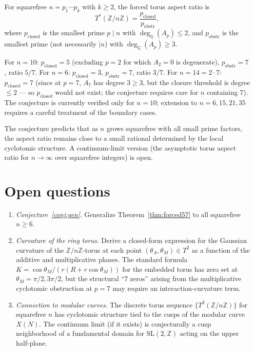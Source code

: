 \documentclass[11pt,reqno]{amsart}
\theoremstyle{plain}
\theoremstyle{definition}
\newcommand{\Z}{\mathbb{Z}}
\newcommand{\Q}{\mathbb{Q}}
\newcommand{\Zn}{\Z/n\Z}
\newcommand{\Tstar}{T^{*}}
\begin{document}
\begin{conjecture} \label{conj:gen}
For squarefree $n = p_1 \cdots p_k$ with $k \geq 2$, the forced torus aspect ratio is
\[
\Tstar(\Zn) = \frac{p_{\mathrm{closed}}}{p_{\mathrm{obstr}}},
\]
where $p_{\mathrm{closed}}$ is the smallest prime $p \mid n$ with $\deg_{\Q}(A_p) \leq 2$, and $p_{\mathrm{obstr}}$ is the smallest prime (not necessarily $\mid n$) with $\deg_{\Q}(A_p) \geq 3$.
\end{conjecture}

For $n = 10$: $p_{\mathrm{closed}} = 5$ (excluding $p = 2$ for which $A_2 = 0$ is degenerate), $p_{\mathrm{obstr}} = 7$, ratio $5/7$. For $n = 6$: $p_{\mathrm{closed}} = 3$, $p_{\mathrm{obstr}} = 7$, ratio $3/7$. For $n = 14 = 2 \cdot 7$: $p_{\mathrm{closed}} = 7$ (since at $p = 7$, $A_7$ has degree $3 \geq 3$, but the closure threshold is degree $\leq 2$ --- so $p_{\mathrm{closed}}$ would not exist; the conjecture requires care for $n$ containing $7$). The conjecture is currently verified only for $n = 10$; extension to $n = 6, 15, 21, 35$ requires a careful treatment of the boundary cases.

The conjecture predicts that as $n$ grows squarefree with all small prime factors, the aspect ratio remains close to a small rational determined by the local cyclotomic structure. A continuum-limit version (the asymptotic torus aspect ratio for $n \to \infty$ over squarefree integers) is open.

\section{Open questions}

\begin{enumerate}[label=(\alph*)]
\item \emph{Conjecture~\ref{conj:gen}.} Generalize Theorem~\ref{thm:forced57} to all squarefree $n \geq 6$.
\item \emph{Curvature of the ring torus.} Derive a closed-form expression for the Gaussian curvature of the $\Zn$-torus at each point $(\theta_A, \theta_M) \in T^2$ as a function of the additive and multiplicative phases. The standard formula $K = \cos \theta_M / (r (R + r \cos \theta_M))$ for the embedded torus has zero set at $\theta_M = \pi/2, 3\pi/2$, but the structural ``$7$ zeros'' arising from the multiplicative cyclotomic obstruction at $p=7$ may require an interaction-curvature term.
\item \emph{Connection to modular curves.} The discrete torus sequence $\{T^2(\Zn)\}$ for squarefree $n$ has cyclotomic structure tied to the cusps of the modular curve $X(N)$. The continuum limit (if it exists) is conjecturally a cusp neighborhood of a fundamental domain for $\mathrm{SL}(2,\Z)$ acting on the upper half-plane.
\end{enumerate}
\end{document}
